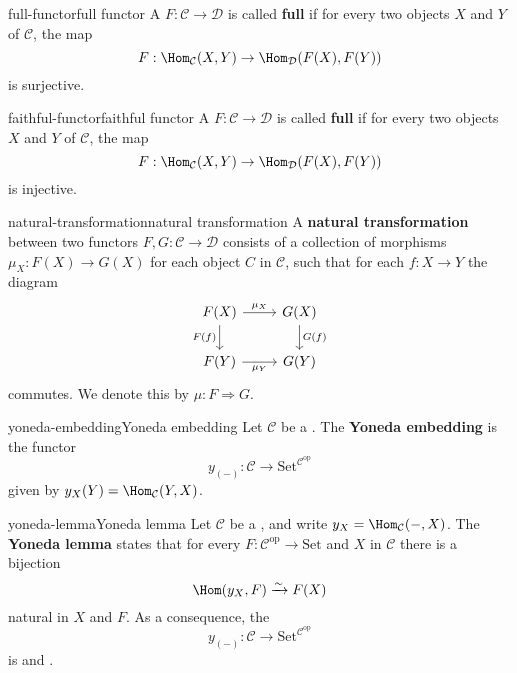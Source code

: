 \begin{topic}{full-functor}{full functor}
    A  $F : \mathcal{C} \to \mathcal{D}$ is called \textbf{full} if for every two objects $X$ and $Y$ of $\mathcal{C}$, the map
    \[ F : \Hom_{\mathcal{C}}(X, Y) \to \Hom_{\mathcal{D}}(F(X), F(Y)) \]
    is surjective.
\end{topic}

\begin{topic}{faithful-functor}{faithful functor}
    A  $F : \mathcal{C} \to \mathcal{D}$ is called \textbf{full} if for every two objects $X$ and $Y$ of $\mathcal{C}$, the map
    \[ F : \Hom_{\mathcal{C}}(X, Y) \to \Hom_{\mathcal{D}}(F(X), F(Y)) \]
    is injective.
\end{topic}

\begin{topic}{natural-transformation}{natural transformation}
    A \textbf{natural transformation} between two functors $F, G : \mathcal{C} \to \mathcal{D}$ consists of a collection of morphisms $\mu_X : F(X) \to G(X)$ for each object $C$ in $\mathcal{C}$, such that for each $f : X \to Y$ the diagram
    \[ \begin{tikzcd} F(X) \arrow{r}{\mu_X} \arrow[swap]{d}{F(f)} & G(X) \arrow{d}{G(f)} \\ F(Y) \arrow[swap]{r}{\mu_Y} & G(Y) \end{tikzcd} \]
    commutes. We denote this by $\mu : F \Rightarrow G$.
\end{topic}

\begin{topic}{yoneda-embedding}{Yoneda embedding}
    Let $\mathcal{C}$ be a . The \textbf{Yoneda embedding} is the functor
    \[ y_{(-)} : \mathcal{C} \to \text{Set}^{\mathcal{C}^\text{op}} \]
    given by $y_X(Y) = \Hom_{\mathcal{C}}(Y, X)$.
\end{topic}

\begin{topic}{yoneda-lemma}{Yoneda lemma}
    Let $\mathcal{C}$ be a , and write $y_X = \Hom_{\mathcal{C}}(-, X)$. The \textbf{Yoneda lemma} states that for every $F : \mathcal{C}^\text{op} \to \text{Set}$ and $X$ in $\mathcal{C}$ there is a bijection
    \[ \Hom(y_X, F) \xrightarrow{\sim} F(X)  \]
    natural in $X$ and $F$. As a consequence, the 
    \[ y_{(-)} : \mathcal{C} \to \text{Set}^{\mathcal{C}^\text{op}} \]
    is  and .
\end{topic}

